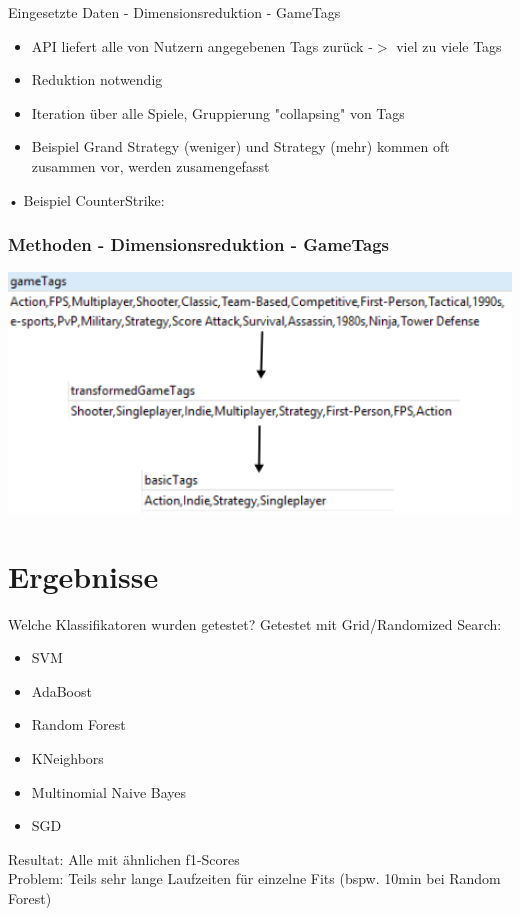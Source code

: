 \documentclass[12pt]{beamer}
\begin{document}
\begin{frame}{Eingesetzte Daten - Dimensionsreduktion - GameTags}
	\begin{itemize}
		\item API liefert alle von Nutzern angegebenen Tags zurück -$>$ viel zu viele Tags
		\item Reduktion notwendig
		\item Iteration über alle Spiele, Gruppierung "collapsing" von Tags
		\item Beispiel Grand Strategy (weniger) und Strategy (mehr) kommen oft zusammen vor, werden zusamengefasst
	\end{itemize}
\end{frame}

\begin{frame}{•}
	Beispiel CounterStrike: \newline \newblock
	\frametitle{Methoden - Dimensionsreduktion - GameTags}
	\includegraphics[width=1\textwidth]{img/cs_gametag_reduction.png}
\end{frame}	


\section{Ergebnisse}
\begin{frame}[fragile]{Welche Klassifikatoren wurden getestet?}
	Getestet mit Grid/Randomized Search:
	\begin{itemize}
		\item SVM 
		\item AdaBoost
		\item Random Forest
		\item KNeighbors
		\item Multinomial Naive Bayes
		\item SGD
	\end{itemize}

	Resultat: Alle mit ähnlichen f1-Scores \\
	Problem: Teils sehr lange Laufzeiten für einzelne Fits (bspw. 10min bei Random Forest)
\end{frame}
\end{document}
